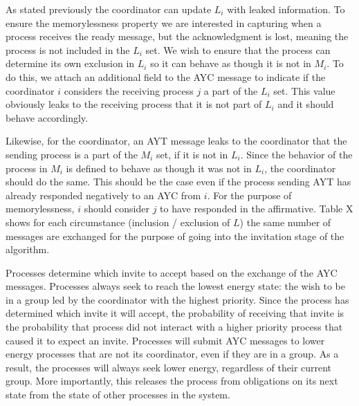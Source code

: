 As stated previously the coordinator can update $L_i$ with leaked information.
To ensure the memorylessness property we are interested in capturing when a process receives the ready message, but the acknowledgment is lost, meaning the process is not included in the $L_i$ set.
We wish to ensure that the process can determine its own exclusion in $L_i$ so it can behave as though it is not in $M_i$.
To do this, we attach an additional field to the \ac{AYC} message to indicate if the coordinator $i$ considers the receiving process $j$ a part of the $L_i$ set.
This value obviously leaks to the receiving process that it is not part of $L_i$ and it should behave accordingly.

Likewise, for the coordinator, an \ac{AYT} message leaks to the coordinator that the sending process is a part of the $M_i$ set, if it is not in $L_i$.
Since the behavior of the process in $M_i$ is defined to behave as though it was not in $L_i$, the coordinator should do the same.
This should be the case even if the process sending \ac{AYT} has already responded negatively to an \ac{AYC} from $i$.
For the purpose of memorylessness, $i$ should consider $j$ to have responded in the affirmative.
Table X shows for each circumstance (inclusion / exclusion of $L$) the same number of messages are exchanged for the purpose of going into the invitation stage of the algorithm.

Processes determine which invite to accept based on the exchange of the \ac{AYC} messages.
Processes always seek to reach the lowest energy state: the wish to be in a group led by the coordinator with the highest priority.
Since the process has determined which invite it will accept, the probability of receiving that invite is the probability that process did not interact with a higher priority process that caused it to expect an invite.
Processes will submit AYC messages to lower energy processes that are not its coordinator, even if they are in a group.
As a result, the processes will always seek lower energy, regardless of their current group.
More importantly, this releases the process from obligations on its next state from the state of other processes in the system.

